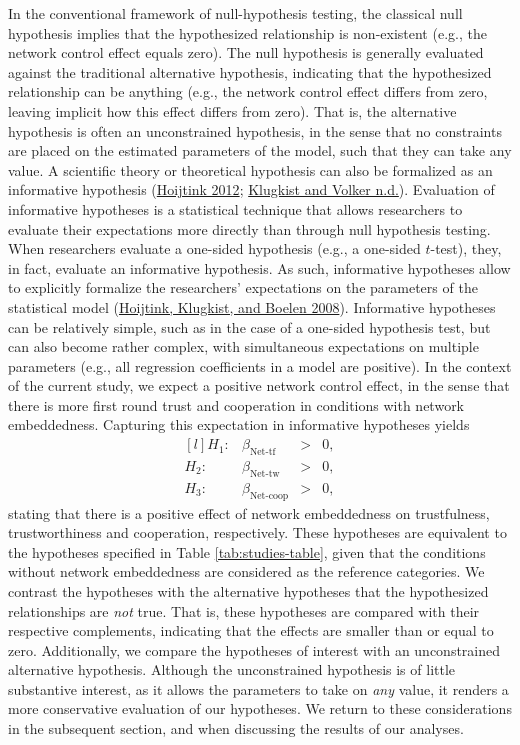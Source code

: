 \documentclass[
  11pt,
]{article}
\begin{document}
In the conventional framework of null-hypothesis testing, the classical null hypothesis implies that the hypothesized relationship is non-existent (e.g., the network control effect equals zero).
The null hypothesis is generally evaluated against the traditional alternative hypothesis, indicating that the hypothesized relationship can be anything (e.g., the network control effect differs from zero, leaving implicit how this effect differs from zero).
That is, the alternative hypothesis is often an unconstrained hypothesis, in the sense that no constraints are placed on the estimated parameters of the model, such that they can take any value.
A scientific theory or theoretical hypothesis can also be formalized as an informative hypothesis (\protect\hyperlink{ref-hoijtink_informative_2012}{Hoijtink 2012}; \protect\hyperlink{ref-klugkist_volker}{Klugkist and Volker n.d.}).
Evaluation of informative hypotheses is a statistical technique that allows researchers to evaluate their expectations more directly than through null hypothesis testing.
When researchers evaluate a one-sided hypothesis (e.g., a one-sided \(t\)-test), they, in fact, evaluate an informative hypothesis.
As such, informative hypotheses allow to explicitly formalize the researchers' expectations on the parameters of the statistical model (\protect\hyperlink{ref-hoijtink_klugkist_boelen_2008}{Hoijtink, Klugkist, and Boelen 2008}).
Informative hypotheses can be relatively simple, such as in the case of a one-sided hypothesis test, but can also become rather complex, with simultaneous expectations on multiple parameters (e.g., all regression coefficients in a model are positive).
In the context of the current study, we expect a positive network control effect, in the sense that there is more first round trust and cooperation in conditions with network embeddedness.
Capturing this expectation in informative hypotheses yields
\[
\begin{matrix*}[l]
H_1: & \beta_{\text{Net-tf}} & > & 0, \\
H_2: & \beta_{\text{Net-tw}} & > & 0, \\
H_3: & \beta_{\text{Net-coop}} & > & 0,
\end{matrix*}
\]
stating that there is a positive effect of network embeddedness on trustfulness, trustworthiness and cooperation, respectively.
These hypotheses are equivalent to the hypotheses specified in Table \ref{tab:studies-table}, given that the conditions without network embeddedness are considered as the reference categories.
We contrast the hypotheses with the alternative hypotheses that the hypothesized relationships are \emph{not} true.
That is, these hypotheses are compared with their respective complements, indicating that the effects are smaller than or equal to zero.
Additionally, we compare the hypotheses of interest with an unconstrained alternative hypothesis.
Although the unconstrained hypothesis is of little substantive interest, as it allows the parameters to take on \emph{any} value, it renders a more conservative evaluation of our hypotheses.
We return to these considerations in the subsequent section, and when discussing the results of our analyses.
\end{document}
